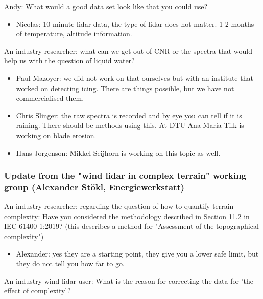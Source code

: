 Andy: What would a good data set look like that you could use?

\begin{itemize}
\item Nicolas: 10 minute lidar data, the type of lidar does not matter. 1-2
  months of temperature, altitude information.
\end{itemize}

An industry researcher: what can we get out of CNR or the spectra that
would help us with the question of liquid water?

\begin{itemize}
\item Paul Mazoyer: we did not work on that ourselves but with an institute
  that worked on detecting icing. There are things possible, but we have
  not commercialised them.
\item Chris Slinger: the raw spectra is recorded and by eye you can tell if
  it is raining. There should be methods using this. At DTU Ana Maria
  Tilk is working on blade erosion.
\item Hans Jorgenson: Mikkel Seijhorn is working on this topic as well.
\end{itemize}

\subsubsection[Update from the "wind lidar in complex terrain" working
group]{Update from the "wind lidar in complex terrain" working
group (Alexander Stökl, Energiewerkstatt)}

An industry researcher: regarding the question of how to quantify
terrain complexity: Have you considered the methodology described in
Section 11.2 in IEC 61400-1:2019? (this describes a method for
"Assessment of the topographical complexity")

\begin{itemize}
\item Alexander: yes they are a starting point, they give you a lower safe
  limit, but they do not tell you how far to go.
\end{itemize}

An industry wind lidar user: What is the reason for correcting the data
for 'the effect of complexity'?

